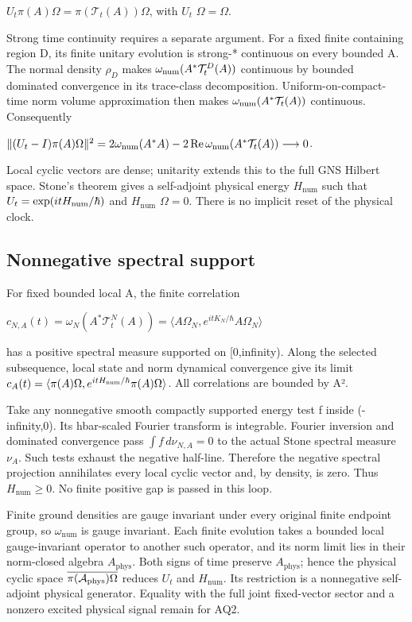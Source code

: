 \(U_t\pi(A)\Omega=\pi(\mathcal T_t(A))\Omega\), with \(U_t\) \(\Omega=\Omega\).

Strong time continuity requires a separate argument. For a fixed finite containing region D, its finite unitary evolution is strong-* continuous on every bounded A. The normal density \(\rho_D\) makes \(\omega_{\rm num}(A^*\mathcal T_t^D(A))\) continuous by bounded dominated convergence in its trace-class decomposition. Uniform-on-compact-time norm volume approximation then makes \(\omega_{\rm num}(A^*\mathcal T_t(A))\) continuous. Consequently

\(\|(U_t-I)\pi(A)\Omega\|^2=2\omega_{\rm num}(A^*A)-2\operatorname{Re}\omega_{\rm num}(A^*\mathcal T_t(A))\longrightarrow0\).

Local cyclic vectors are dense; unitarity extends this to the full GNS Hilbert space. Stone's theorem gives a self-adjoint physical energy \(H_{\mathrm{num}}\) such that \(U_t=\exp(itH_{\rm num}/\hbar)\) and \(H_{\mathrm{num}}\) \(\Omega=0\). There is no implicit reset of the physical clock.

\hypertarget{r29-aq1-nonnegative-spectral-support}{%
\subsection{Nonnegative spectral support}\label{r29:aq1:r29-aq1-nonnegative-spectral-support}}

For fixed bounded local A, the finite correlation

\(c_{N,A}(t)=\omega_N(A^*\mathcal T_t^N(A))=\langle A\Omega_N,e^{itK_N/\hbar}A\Omega_N\rangle\)

has a positive spectral measure supported on {[}0,infinity). Along the selected subsequence, local state and norm dynamical convergence give its limit \(c_A(t)=\langle\pi(A)\Omega,e^{itH_{\rm num}/\hbar}\pi(A)\Omega\rangle\). All correlations are bounded by \textbar\textbar A\textbar\textbar².

Take any nonnegative smooth compactly supported energy test f inside (-infinity,0). Its hbar-scaled Fourier transform is integrable. Fourier inversion and dominated convergence pass \(\int f\,d\nu_{N,A}=0\) to the actual Stone spectral measure \(\nu_A\). Such tests exhaust the negative half-line. Therefore the negative spectral projection annihilates every local cyclic vector and, by density, is zero. Thus \(H_{\mathrm{num}}\ge 0\). No finite positive gap is passed in this loop.

Finite ground densities are gauge invariant under every original finite endpoint group, so \(\omega_{\mathrm{num}}\) is gauge invariant. Each finite evolution takes a bounded local gauge-invariant operator to another such operator, and its norm limit lies in their norm-closed algebra \(A_{\mathrm{phys}}\). Both signs of time preserve \(A_{\mathrm{phys}}\); hence the physical cyclic space \(\overline{\pi(\mathcal A_{\rm phys})\Omega}\) reduces \(U_t\) and \(H_{\mathrm{num}}\). Its restriction is a nonnegative self-adjoint physical generator. Equality with the full joint fixed-vector sector and a nonzero excited physical signal remain for AQ2.

